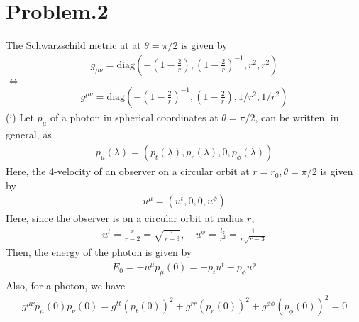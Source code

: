 \documentclass[12pt]{article}
\begin{document}
\section*{Problem.2}
The Schwarzschild metric at at $\theta = \pi/2$ is given by
\begin{align}
g_{\mu \nu} = \mathrm{diag} \left(- \left(1 - \frac{2}{r}\right), \left(1 - \frac{2}{r}\right)^{-1}, r^2, r^2 \right)
\end{align}
$\Leftrightarrow$
\begin{align}
g^{\mu \nu} = \mathrm{diag} \left(- \left(1 - \frac{2}{r}\right)^{-1}, \left(1 - \frac{2}{r}\right), 1/r^2, 1/r^2 \right)
\end{align}
(i) Let $p_{\mu}$ of a photon in spherical coordinates at $\theta = \pi/2$, can be written, in general, as
\begin{align}
p_{\mu}(\lambda) = \left(p_{t}(\lambda), p_{r}(\lambda), 0, p_{\phi}(\lambda) \right)
\end{align}
Here, the 4-velocity of an observer on a circular orbit at $r = r_0, \theta = \pi/2$ is given by
\begin{align}
u^{\mu} = \left(u^{t}, 0, 0, u^{\phi} \right)
\end{align}
Here, since the observer is on a circular orbit at radius $r$,
\begin{align}
u^{t} = \frac{r}{r - 2} = \sqrt{\frac{r}{r - 3}}, \quad u^{\phi} = \frac{l_z}{r^2} = \frac{1}{r \sqrt{r - 3}}
\end{align}
Then, the energy of the photon is given by
\begin{align}
E_0 = - u^{\mu} p_{\mu}(0) = - p_{t} u^{t} - p_{\phi} u^{\phi}
\end{align}
Also, for a photon, we have
\begin{align}
g^{\mu \nu} p_{\mu}(0) p_{\nu}(0) = g^{tt} \left(p_{t}(0)\right)^2 + g^{rr} \left(p_{r}(0)\right)^2 + g^{\phi \phi} \left(p_{\phi}(0)\right)^2 = 0
\end{align}
\end{document}
